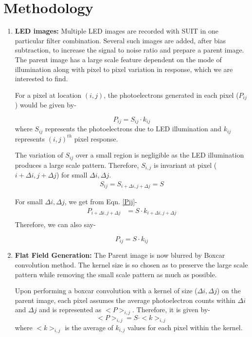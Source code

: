 \documentclass[11pt,a4paper]{article}
\begin{document}
\section{Methodology} 
	\begin{enumerate}
		\item \textbf{LED images:} Multiple LED images are recorded with SUIT in one particular filter combination. Several such images are added, after bias subtraction, to increase the signal to noise ratio and prepare a parent image.	The parent image has a large scale feature dependent on the mode of illumination along with pixel to pixel variation in response, which we are interested to find. 
	
	For a pixel at location $(i,j)$, the photoelectrons generated in each pixel ($P_{ij}$) would be given by-
	
	\begin{equation}
		P_{ij} = S_{ij}\cdot k_{ij}  \label{Pij}
	\end{equation}
	where $ S_{ij} $ represents the photoelectrons due to LED illumination and $k_{ij}$ represents $(i,j)^{th}$ pixel response.
	
	The variation of $ S_{ij} $ over a small region is negligible as the LED illumination produces a large scale pattern. Therefore, $S_{i,j}$ is invariant at pixel ($i+\Delta i, j+\Delta j$)  for small $\Delta i, \Delta j$.
	\begin{align}
		S_{ij}= S_{i+\Delta i, j + \Delta j} = S
	\end{align}  
	
	For small $\Delta i, \Delta j$, we get from Eqn. \ref{Pij}-
	\begin{align}
		P_{i+\Delta i, j + \Delta j}&= S \cdot k_{i+\Delta i, j + \Delta j}\\
	\end{align}
	Therefore, we can also say-
	
	\begin{equation}
		P_{ij} = S\cdot k_{ij}
	\end{equation}
	
	\item \textbf{Flat Field Generation:} The Parent image is now blurred by Boxcar convolution method.  The kernel size is so chosen as to preserve the large scale pattern while removing the small scale pattern as much as possible. 
		
	Upon performing a boxcar convolution with a kernel of size ($\Delta i, \Delta j$) on the parent image, each pixel assumes the average photoelectron counts within $\Delta i$ and $\Delta j$ and is represented as $<P>_{i,j}$. Therefore, it is given by- 
	\begin{equation}
		<P>_{i,j}= S \cdot <k>_{i,j}
	\end{equation}
	where $ <k>_{i,j}$ is the average of $ k_{i,j}$ values for each pixel within the kernel.
	

\end{enumerate}
\end{document}
